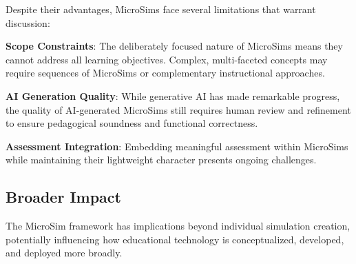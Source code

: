 Despite their advantages, MicroSims face several limitations that warrant discussion:

\textbf{Scope Constraints}: The deliberately focused nature of MicroSims means they cannot address all learning objectives. Complex, multi-faceted concepts may require sequences of MicroSims or complementary instructional approaches.

\textbf{AI Generation Quality}: While generative AI has made remarkable progress, the quality of AI-generated MicroSims still requires human review and refinement to ensure pedagogical soundness and functional correctness.

\textbf{Assessment Integration}: Embedding meaningful assessment within MicroSims while maintaining their lightweight character presents ongoing challenges.

\subsection{Broader Impact}

The MicroSim framework has implications beyond individual simulation creation, potentially influencing how educational technology is conceptualized, developed, and deployed more broadly.

